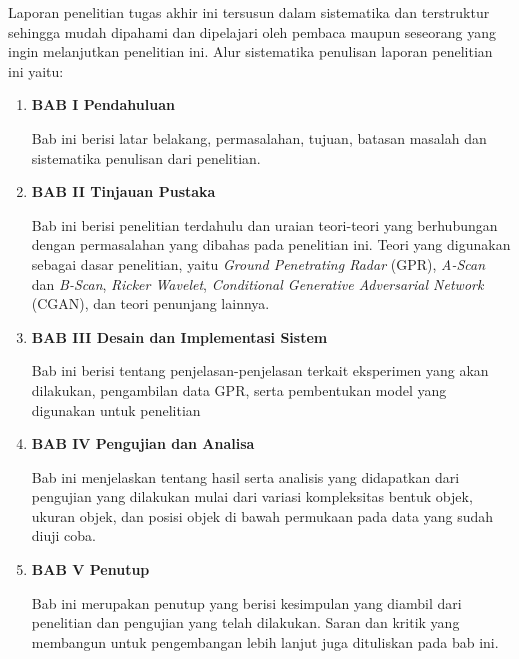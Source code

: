Laporan penelitian tugas akhir ini tersusun dalam sistematika dan terstruktur sehingga mudah dipahami dan dipelajari oleh pembaca maupun seseorang yang ingin melanjutkan penelitian ini. 
Alur sistematika penulisan laporan penelitian ini yaitu:

\begin{enumerate}[nolistsep]

  \item \textbf{BAB I Pendahuluan}

        Bab ini berisi latar belakang, permasalahan, tujuan, batasan masalah dan sistematika penulisan dari penelitian.

        \vspace{2ex}

  \item \textbf{BAB II Tinjauan Pustaka}

        Bab ini berisi penelitian terdahulu dan uraian teori-teori yang berhubungan dengan permasalahan yang dibahas pada penelitian ini.
        Teori yang digunakan sebagai dasar penelitian, yaitu \emph{Ground Penetrating Radar} (GPR), \emph{A-Scan} dan \emph{B-Scan}, \emph{Ricker Wavelet}, \emph{Conditional Generative Adversarial Network} (CGAN), dan teori penunjang lainnya.

        \vspace{2ex}

  \item \textbf{BAB III Desain dan Implementasi Sistem}

        Bab ini berisi tentang penjelasan-penjelasan terkait eksperimen yang akan dilakukan, pengambilan data GPR, serta pembentukan model yang digunakan untuk penelitian 

        \vspace{2ex}

  \item \textbf{BAB IV Pengujian dan Analisa}

        Bab ini menjelaskan tentang hasil serta analisis yang didapatkan dari pengujian yang dilakukan mulai dari variasi kompleksitas bentuk objek, ukuran objek, dan posisi objek di bawah permukaan pada data yang sudah diuji coba.

        \vspace{2ex}

  \item \textbf{BAB V Penutup}

        Bab ini merupakan penutup yang berisi kesimpulan yang diambil dari penelitian dan pengujian yang telah dilakukan. 
        Saran dan kritik yang membangun untuk pengembangan lebih lanjut juga dituliskan pada bab ini.

\end{enumerate}

